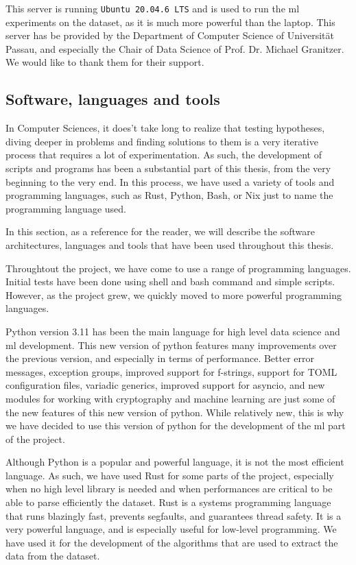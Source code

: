     This server is running \texttt{Ubuntu 20.04.6 LTS} and is used to run the \acrshort{ml} experiments on the dataset, as it is much more powerful than the laptop. This server has be provided by the Department of Computer Science of Universität Passau, and especially the Chair of Data Science of Prof. Dr. Michael Granitzer. We would like to thank them for their support.

    \subsection{Software, languages and tools}
    In Computer Sciences, it does't take long to realize that testing hypotheses, diving deeper in problems and finding solutions to them is a very iterative process that requires a lot of experimentation. As such, the development of scripts and programs has been a substantial part of this thesis, from the very beginning to the very end. In this process, we have used a variety of tools and programming languages, such as Rust, Python, Bash, or Nix just to name the programming language used.

    In this section, as a reference for the reader, we will describe the software architectures, languages and tools that have been used throughout this thesis.

    Throughtout the project, we have come to use a range of programming languages. Initial tests have been done using shell and bash command and simple scripts. However, as the project grew, we quickly moved to more powerful programming languages. 

    Python version 3.11 has been the main language for high level data science and \acrshort{ml} development. This new version of python features many improvements over the previous version, and especially in terms of performance. Better error messages, exception groups, improved support for f-strings, support for TOML configuration files, variadic generics, improved support for asyncio, and new modules for working with cryptography and machine learning are just some of the new features of this new version of python. While relatively new, this is why we have decided to use this version of python for the development of the \acrshort{ml} part of the project.

    Although Python is a popular and powerful language, it is not the most efficient language. As such, we have used Rust for some parts of the project, especially when no high level library is needed and when performances are critical to be able to parse efficiently the dataset. Rust is a systems programming language that runs blazingly fast, prevents segfaults, and guarantees thread safety. It is a very powerful language, and is especially useful for low-level programming. We have used it for the development of the algorithms that are used to extract the data from the dataset.

